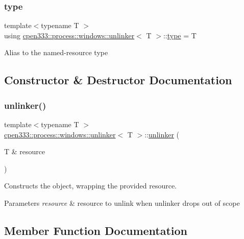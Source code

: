 \subsubsection{\texorpdfstring{type}{type}}
{\footnotesize\ttfamily template$<$typename T $>$ \\
using \hyperlink{classcpen333_1_1process_1_1windows_1_1unlinker}{cpen333\+::process\+::windows\+::unlinker}$<$ T $>$\+::\hyperlink{classcpen333_1_1process_1_1windows_1_1unlinker_a8fc5b25e2201aa44cf2323b46a98654b}{type} =  T}

Alias to the named-\/resource type 

\subsection{Constructor \& Destructor Documentation}
\mbox{\label{classcpen333_1_1process_1_1windows_1_1unlinker_aea3673b83a0810f21f537f503c8db271}} 
\subsubsection{\texorpdfstring{unlinker()}{unlinker()}}
{\footnotesize\ttfamily template$<$typename T $>$ \\
\hyperlink{classcpen333_1_1process_1_1windows_1_1unlinker}{cpen333\+::process\+::windows\+::unlinker}$<$ T $>$\+::\hyperlink{classcpen333_1_1process_1_1windows_1_1unlinker}{unlinker} (\begin{DoxyParamCaption}\item[{T \&}]{resource }\end{DoxyParamCaption})\hspace{0.3cm}{\ttfamily [inline]}}



Constructs the object, wrapping the provided resource. 


\begin{DoxyParams}{Parameters}
{\em resource} & resource to unlink when unlinker drops out of scope \\
\hline
\end{DoxyParams}


\subsection{Member Function Documentation}
\mbox{\label{classcpen333_1_1process_1_1windows_1_1unlinker_a178646833bce209b221bd3262ab012bb}} 
